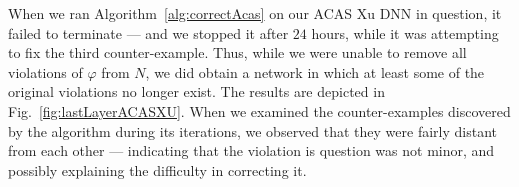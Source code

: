 \documentclass{easychair}
\newcommand{\guy}[1]{\marginpar{\textcolor{orange}{Guy: #1}}}
\newcommand{\ben}[1]{\marginpar{\textcolor{blue}{Ben: #1}}}
\begin{document}
When we ran Algorithm~\ref{alg:correctAcas} on our ACAS Xu DNN in
question, it failed to terminate --- and we stopped it after $24$
hours, \guy{Ben, do you know how long it took until the 3rd
  counter-example was found? To adjust the timeout values...} \ben{about 4-5 days}  while it
was attempting to fix the third counter-example. Thus, while we were
unable to remove all violations of $\varphi$ from $N$, we did obtain a
network in which at least some of the original violations no longer
exist.  The results are depicted in
Fig.~\ref{fig:lastLayerACASXU}. When we examined
the counter-examples discovered by the algorithm during its
iterations, we observed that they were fairly distant from
each other --- indicating that the violation is question was not
minor, and possibly explaining the difficulty in correcting it.
\end{document}
